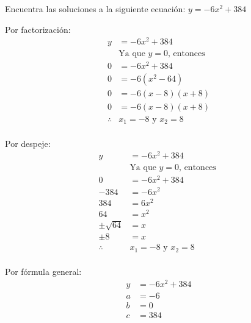 Encuentra las soluciones a la siguiente ecuación:
$y=-6x^2 +384$

\begin{solutionbox}{13cm}
    \begin{multicols}{2}
        Por factorización:
        \begin{align*}
            y          & =	      -6x^2 +384              \\
                       & \text{Ya que $y=0$, entonces } \\
            0          & =	      -6x^2 +384              \\
            0          & =		 -6(x^2 -64)                  \\
            0          & =		 -6(x - 8)(x + 8)             \\
            0          & =	       -6(x - 8)(x + 8)       \\
            \therefore & x_1 =-8 \text{ y } x_2 =8
        \end{align*}
        \\
        Por despeje:
        \begin{align*}
            y             & =	 -6x^2 +384                   \\
                          & \text{Ya que $y=0$, entonces } \\
            0             & =	  -6x^2 +384                  \\
            -384          & =	  -6x^2                       \\
            384           & =	  6x^2                        \\
            64            & =	  x^2                         \\
            \pm \sqrt{64} & =	  x                           \\
            \pm 8         & =	  x                           \\
            \therefore    & x_1 =-8 \text{ y } x_2 =8
        \end{align*}
        \\
        Por fórmula general:
        \begin{align*}
            y          & =	      -6x^2 +384
            \\
            a          & =-6
            \\
            b          & =0
            \\
            c          & =384
            \\

\end{align*}
\end{multicols}
\end{solutionbox}
